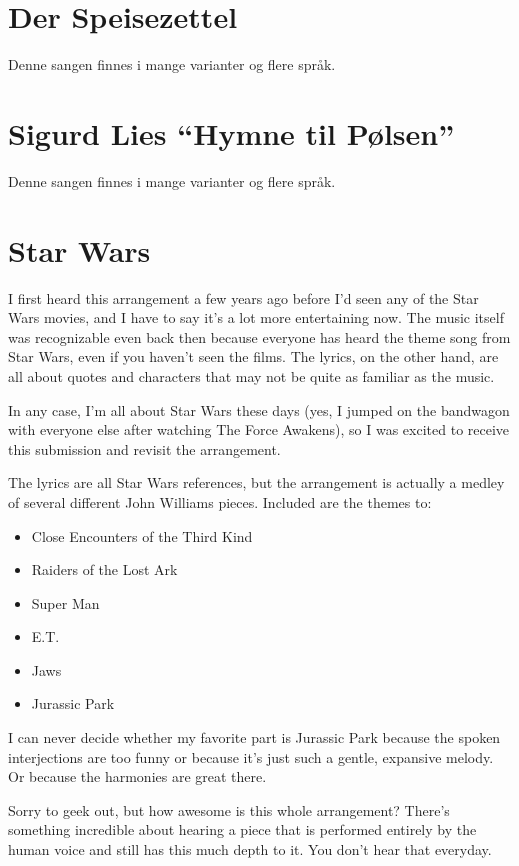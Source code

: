 \section{Der Speisezettel}
Denne sangen finnes i mange varianter og flere språk. \lipsum[13-15]
\section{Sigurd Lies ``Hymne til Pølsen''}
Denne sangen finnes i mange varianter og flere språk. \lipsum[16-18]
\section{Star Wars}
I first heard this arrangement a few years ago before I'd seen any of the Star Wars movies, and I have to say it's a lot more entertaining now. The music itself was recognizable even back then because everyone has heard the theme song from Star Wars, even if you haven't seen the films. The lyrics, on the other hand, are all about quotes and characters that may not be quite as familiar as the music.

In any case, I'm all about Star Wars these days (yes, I jumped on the bandwagon with everyone else after watching The Force Awakens), so I was excited to receive this submission and revisit the arrangement.

The lyrics are all Star Wars references, but the arrangement is actually a medley of several different John Williams pieces. Included are the themes to:

\begin{itemize}
\item Close Encounters of the Third Kind
\item Raiders of the Lost Ark
\item Super Man
\item E.T.
\item Jaws
\item Jurassic Park
\end{itemize}

I can never decide whether my favorite part is Jurassic Park because the spoken interjections are too funny or because it's just such a gentle, expansive melody. Or because the harmonies are great there.

Sorry to geek out, but how awesome is this whole arrangement? There's something incredible about hearing a piece that is performed entirely by the human voice and still has this much depth to it. You don't hear that everyday.

